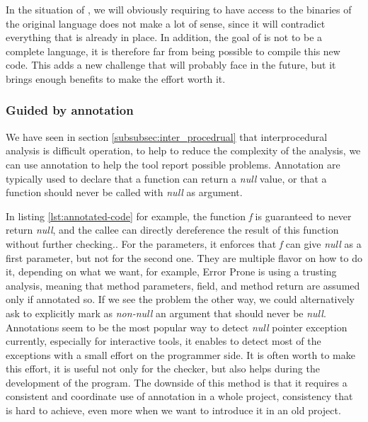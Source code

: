 In the situation of \slang{}, we will obviously requiring to have access to the binaries of the original language does not make a lot of sense, since it will contradict everything that is already in place.
In addition, the goal of \slang{} is not to be a complete language, it is therefore far from being possible to compile this new code. 
This adds a new challenge that \slang{} will probably face in the future, but it brings enough benefits to make the effort worth it.

\subsubsection{Guided by annotation}
\label{subsubsec:guided_by_annotation}

We have seen in section \ref{subsubsec:inter_procedrual} that interprocedural analysis is difficult operation, to help to reduce the complexity of the analysis, we can use annotation to help the tool report possible problems. 
Annotation are typically used to declare that a function can return a \emph{null} value, or that a function should never be called with \emph{null} as argument.



In listing \ref{lst:annotated-code} for example, the function \emph{f} is guaranteed to never return \emph{null}, and the callee can directly dereference the result of this function without further checking..
For the parameters, it enforces that \emph{f} can give \emph{null} as a first parameter, but not for the second one.\newline
They are multiple flavor on how to do it, depending on what we want, for example, Error Prone is using a trusting analysis, meaning that method parameters, field, and method return are assumed \nullable{} only if annotated so. 
If we see the problem the other way, we could alternatively ask to explicitly mark as \emph{non-null} an argument that should never be \emph{null}.\newline
Annotations seem to be the most popular way to detect \emph{null} pointer exception currently, especially for interactive tools, it enables to detect most of the exceptions with a small effort on the programmer side. 
It is often worth to make this effort, it is useful not only for the checker, but also helps during the development of the program.
The downside of this method is that it requires a consistent and coordinate use of annotation in a whole project, consistency that is hard to achieve, even more when we want to introduce it in an old project.


